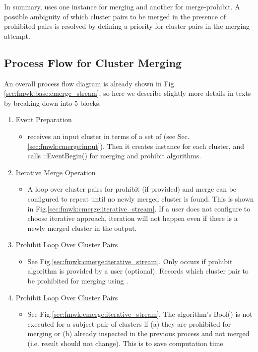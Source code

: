 In summary, {\cmerge} uses one {\cmalgo} instance for merging and another for merge-prohibit. A possible ambiguity of which cluster pairs to be merged in the presence of prohibited pairs is resolved by defining a priority for cluster pairs in the merging attempt. 

\subsection{Process Flow for Cluster Merging}
\label{sec:fmwk:cmerge:process_flow}
An overall process flow diagram is already shown in Fig.\ref{sec:fmwk:base:cmerge_stream}, so here we describe slightly more details in texts by breaking down into 5 blocks.
\begin{enumerate}
\item Event Preparation
  \begin{itemize}
    \item[] {\cmerge} receives an input cluster in terms of a set of {\pxhit} (see Sec.\ref{sec:fmwk:cmerge:input}). Then it creates {\cpan} instance for each cluster, and calls {\cmalgo::EventBegin()} for merging and prohibit algorithms.
  \end{itemize}

\item Iterative Merge Operation
  \begin{itemize}
    \item[] A loop over cluster pairs for prohibit (if provided) and merge {\cmalgo} can be configured to repeat until no newly merged cluster is found. This is shown in Fig.\ref{sec:fmwk:cmerge:iterative_stream}. If a user does not configure to choose iterative approach, iteration will not happen even if there is a newly merged cluster in the output.
  \end{itemize}

\item Prohibit {\cmalgo} Loop Over Cluster Pairs
  \begin{itemize}
    \item[] See Fig.\ref{sec:fmwk:cmerge:iterative_stream}. Only occurs if prohibit algorithm is provided by a user (optional). Records which cluster pair to be prohibited for merging using {\cbkeeper}.
  \end{itemize}

\item Prohibit {\cmalgo} Loop Over Cluster Pairs
  \begin{itemize}
    \item[] See Fig.\ref{sec:fmwk:cmerge:iterative_stream}. The algorithm's {\ttfamily Bool()} is not executed for a subject pair of clusters if (a) they are prohibited for merging or (b) already inspected in the previous process and not merged (i.e. result should not change). This is to save computation time.
  \end{itemize}


\end{enumerate}
